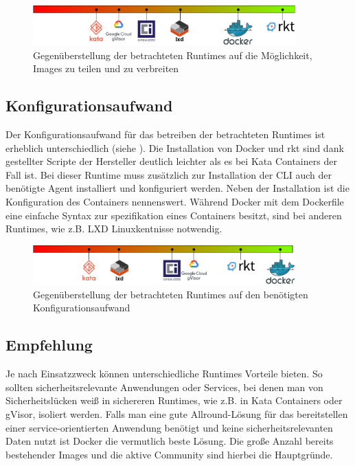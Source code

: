 \begin{figure}[h]
	\begin{center}
		\includegraphics[width=0.9\textwidth]{bilder/rating-share.pdf}
		\caption{Gegenüberstellung der betrachteten Runtimes auf die Möglichkeit, Images zu teilen und zu verbreiten}
		\label{fig:compFazitShare}
	\end{center}
\end{figure}

\subsection{Konfigurationsaufwand}
\label{sec:compFazitConfig}

Der Konfigurationsaufwand für das betreiben der betrachteten Runtimes ist erheblich unterschiedlich (siehe ). Die Installation von Docker und rkt sind dank gestellter Scripte der Hersteller deutlich leichter als es bei Kata Containers der Fall ist. Bei dieser Runtime muss zusätzlich zur Installation der CLI auch der benötigte Agent installiert und konfiguriert werden. Neben der Installation ist die Konfiguration des Containers nennenswert. Während Docker mit dem Dockerfile eine einfache Syntax zur spezifikation eines Containers besitzt, sind bei anderen Runtimes, wie z.B. LXD Linuxkentnisse notwendig. 

\begin{figure}[h]
	\begin{center}
		\includegraphics[width=0.9\textwidth]{bilder/rating-config.pdf}
		\caption{Gegenüberstellung der betrachteten Runtimes auf den benötigten Konfigurationsaufwand}
		\label{fig:comFazitConfig}
	\end{center}
\end{figure}

\subsection{Empfehlung}
\label{sec:compFazitEmpfehlung}

Je nach Einsatzzweck können unterschiedliche Runtimes Vorteile bieten. So sollten sicherheitsrelevante Anwendungen oder Services, bei denen man von Sicherheitslücken weiß in sichereren Runtimes, wie z.B. in Kata Containers oder gVisor, isoliert werden. Falls man eine gute Allround-Lösung für das bereitstellen einer service-orientierten Anwendung benötigt und keine sicherheitsrelevanten Daten nutzt ist Docker die vermutlich beste Lösung. Die große Anzahl bereits bestehender Images und die aktive Community sind hierbei die Hauptgründe.
